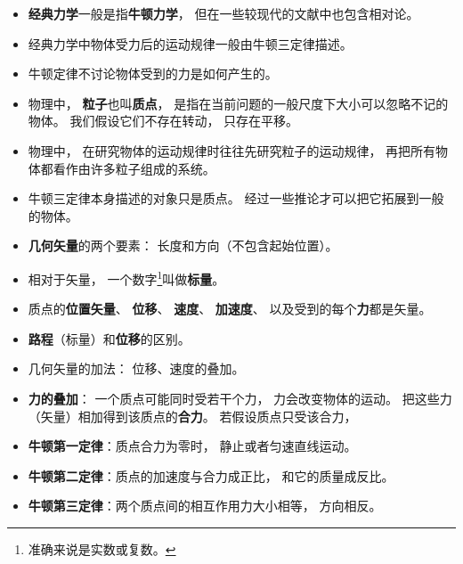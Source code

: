 
\begin{issues}
\issueDraft
\end{issues}

\begin{itemize}
\item \textbf{经典力学}一般是指\textbf{牛顿力学}， 但在一些较现代的文献中也包含相对论。
\item 经典力学中物体受力后的运动规律一般由牛顿三定律描述。
\item 牛顿定律不讨论物体受到的力是如何产生的。
\item 物理中， \textbf{粒子}也叫\textbf{质点}， 是指在当前问题的一般尺度下大小可以忽略不记的物体。 我们假设它们不存在转动， 只存在平移。
\item 物理中， 在研究物体的运动规律时往往先研究粒子的运动规律， 再把所有物体都看作由许多粒子组成的系统。
\item 牛顿三定律本身描述的对象只是质点。 经过一些推论才可以把它拓展到一般的物体。
\item \textbf{几何矢量}的两个要素： 长度和方向（不包含起始位置）。
\item 相对于矢量， 一个数字\footnote{准确来说是实数或复数。}叫做\textbf{标量}。
\item 质点的\textbf{位置矢量}、 \textbf{位移}、 \textbf{速度}、 \textbf{加速度}、 以及受到的每个\textbf{力}都是矢量。
\item \textbf{路程}（标量）和\textbf{位移}的区别。
\item 几何矢量的加法： 位移、速度的叠加。
\item \textbf{力的叠加}： 一个质点可能同时受若干个力， 力会改变物体的运动。 把这些力（矢量）相加得到该质点的\textbf{合力}。 若假设质点只受该合力， 
\item \textbf{牛顿第一定律}：质点合力为零时， 静止或者匀速直线运动。
\item \textbf{牛顿第二定律}：质点的加速度与合力成正比， 和它的质量成反比。
\item \textbf{牛顿第三定律}：两个质点间的相互作用力大小相等， 方向相反。
\end{itemize}
